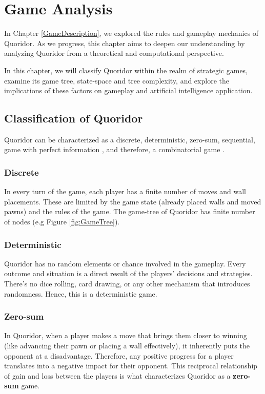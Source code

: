 \chapter{Game Analysis}
\label{GameAnalysis}

In Chapter \ref{GameDescription}, we explored the rules and gameplay mechanics of Quoridor.
As we progress, this chapter aims to deepen our understanding by analyzing Quoridor from a
theoretical and computational perspective.

In this chapter, we will classify Quoridor within the realm of strategic games, examine its game tree,
state-space and tree complexity, and explore the implications of these factors on gameplay and
artificial intelligence application.

\section{Classification of Quoridor}

Quoridor can be characterized as a discrete, deterministic, zero-sum, sequential, game with perfect
information \citep{Glendenning2002MasteringQ}, and therefore, a combinatorial game \citep{GameTheoryBook}. 

\subsection{Discrete}
In every turn of the game, each player has a finite number of moves and wall placements. These are limited by the game state (already placed walls and moved pawns) and the rules of the game. The game-tree of Quoridor has finite number of nodes (e.g Figure \ref{fig:GameTree}).

\subsection{Deterministic}
Quoridor has no random elements or chance involved in the gameplay. Every outcome and situation
is a direct result of the players' decisions and strategies. There's no dice rolling,
card drawing, or any other mechanism that introduces randomness. Hence, this is a deterministic game.

\subsection{Zero-sum}
In Quoridor, when a player makes a move that brings them closer to winning (like advancing their pawn or placing a wall effectively), it inherently puts the opponent at a disadvantage. Therefore, any positive progress for a player translates into a negative impact for their opponent. This reciprocal relationship of gain and loss between the players is what characterizes Quoridor as a \textbf{zero-sum} game.


